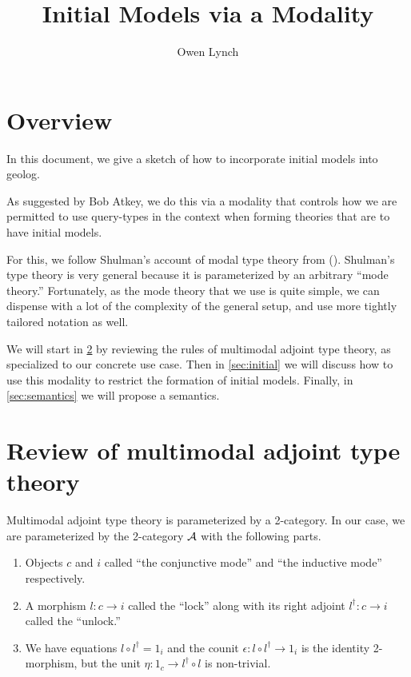 \documentclass[fleqn,leqno]{article}
\title{Initial Models via a Modality}
\author{Owen Lynch}
\begin{document}
\maketitle

\section{Overview}

In this document, we give a sketch of how to incorporate initial models into geolog.

As suggested by Bob Atkey, we do this via a modality that controls how we are permitted to use query-types in the context when forming theories that are to have initial models.

For this, we follow Shulman's account of modal type theory from (\cite{shulman-2023-semantics}). Shulman's type theory is very general because it is parameterized by an arbitrary ``mode theory.'' Fortunately, as the mode theory that we use is quite simple, we can dispense with a lot of the complexity of the general setup, and use more tightly tailored notation as well.

We will start in \cref{sec:matt} by reviewing the rules of multimodal adjoint type theory, as specialized to our concrete use case. Then in \cref{sec:initial} we will discuss how to use this modality to restrict the formation of initial models. Finally, in \cref{sec:semantics} we will propose a semantics.

\section{Review of multimodal adjoint type theory} \label{sec:matt}

Multimodal adjoint type theory is parameterized by a 2-category. In our case, we are parameterized by the 2-category $\mathcal{A}$ with the following parts.

\begin{enumerate}
  \item Objects $c$ and $i$ called ``the conjunctive mode'' and ``the inductive mode'' respectively.
  \item A morphism $l \colon c \to i$ called the ``lock'' along with its right adjoint $l^\dagger \colon c \to i$ called the ``unlock.''
  \item We have equations $l \circ l^\dagger = 1_i$ and the counit $\epsilon \colon l \circ l^\dagger \to 1_i$ is the identity 2-morphism, but the unit $\eta \colon 1_c \to l^\dagger \circ l$ is non-trivial.
\end{enumerate}
\end{document}
